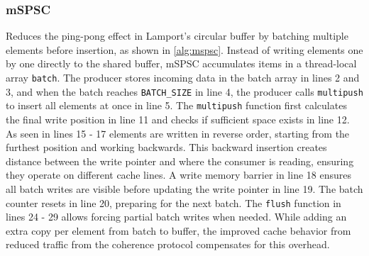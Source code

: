 \subsubsection{\acl{mSPSC}}
Reduces the ping-pong effect in Lamport's circular buffer by batching multiple elements before insertion, as shown in \cref{alg:mspsc}. Instead of writing elements one by one directly to the shared buffer, \ac{mSPSC} accumulates items in a thread-local array \texttt{batch}. The producer stores incoming data in the batch array in lines 2 and 3, and when the batch reaches \texttt{BATCH\_SIZE} in line 4, the producer calls \texttt{multipush} to insert all elements at once in line 5. The \texttt{multipush} function first calculates the final write position in line 11 and checks if sufficient space exists in line 12. As seen in lines 15 - 17 elements are written in reverse order, starting from the furthest position and working backwards. This backward insertion creates distance between the write pointer and where the consumer is reading, ensuring they operate on different cache lines. A write memory barrier in line 18 ensures all batch writes are visible before updating the write pointer in line 19. The batch counter resets in line 20, preparing for the next batch. The \texttt{flush} function in lines 24 - 29 allows forcing partial batch writes when needed. While adding an extra copy per element from batch to buffer, the improved cache behavior from reduced traffic from the coherence protocol compensates for this overhead. \cite{torquati2010singleproducersingleconsumerqueuessharedcache}

